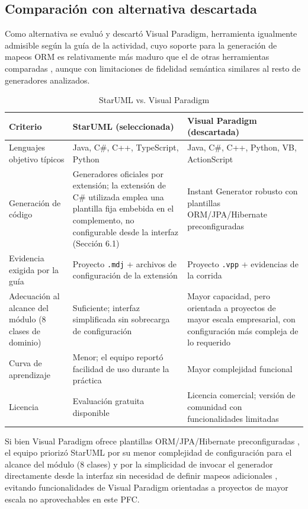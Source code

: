 \documentclass[journal,onecolumn]{IEEEtran}
\begin{document}
\subsection{Comparación con alternativa descartada}
Como alternativa se evaluó y descartó Visual Paradigm, herramienta igualmente admisible según la guía de la actividad, cuyo soporte para la generación de mapeos ORM es relativamente más maduro que el de otras herramientas comparadas \cite{Sejans2011}, aunque con limitaciones de fidelidad semántica similares al resto de generadores analizados.
\begin{table}[H]
	\centering
	\caption{StarUML vs. Visual Paradigm}
	\label{tab:staruml_vp}
	\begin{tabular}{|p{5cm}|p{5cm}|p{5cm}|}
		\hline
		\textbf{Criterio} & \textbf{StarUML (seleccionada)} & \textbf{Visual Paradigm (descartada)} \\
		\hline
		Lenguajes objetivo típicos & Java, C\#, C++, TypeScript, Python & Java, C\#, C++, Python, VB, ActionScript \\
		\hline
		Generación de código & Generadores oficiales por extensión; la extensión de C\# utilizada emplea una plantilla fija embebida en el complemento, no configurable desde la interfaz (Sección 6.1) & Instant Generator robusto con plantillas ORM/JPA/Hibernate preconfiguradas \\
		\hline
		Evidencia exigida por la guía & Proyecto \texttt{.mdj} + archivos de configuración de la extensión & Proyecto \texttt{.vpp} + evidencias de la corrida \\
		\hline
		Adecuación al alcance del módulo (8 clases de dominio) & Suficiente; interfaz simplificada sin sobrecarga de configuración & Mayor capacidad, pero orientada a proyectos de mayor escala empresarial, con configuración más compleja de lo requerido \\
		\hline
		Curva de aprendizaje & Menor; el equipo reportó facilidad de uso durante la práctica & Mayor complejidad funcional \\
		\hline
		Licencia & Evaluación gratuita disponible & Licencia comercial; versión de comunidad con funcionalidades limitadas \\
		\hline
	\end{tabular}
\end{table}

Si bien Visual Paradigm ofrece plantillas ORM/JPA/Hibernate preconfiguradas \cite{Sejans2011}, el equipo priorizó StarUML por su menor complejidad de configuración para el alcance del módulo (8 clases) y por la simplicidad de invocar el generador directamente desde la interfaz sin necesidad de definir mapeos adicionales \cite{Syriani2018}, evitando funcionalidades de Visual Paradigm orientadas a proyectos de mayor escala no aprovechables en este PFC.
\end{document}
